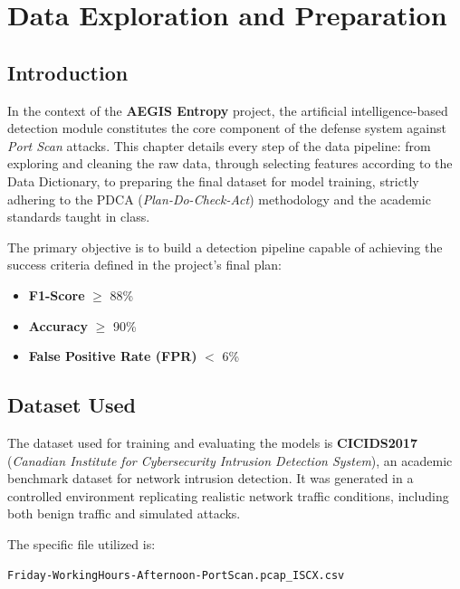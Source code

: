 
\chapter{Data Exploration and Preparation}

\section{Introduction}

In the context of the \textbf{AEGIS Entropy} project, the artificial intelligence-based detection module constitutes the core component of the defense system against \textit{Port Scan} attacks. This chapter details every step of the data pipeline: from exploring and cleaning the raw data, through selecting features according to the Data Dictionary, to preparing the final dataset for model training, strictly adhering to the PDCA (\textit{Plan-Do-Check-Act}) methodology and the academic standards taught in class.

The primary objective is to build a detection pipeline capable of achieving the success criteria defined in the project's final plan:
\begin{itemize}
    \item \textbf{F1-Score} $\geq$ 88\%
    \item \textbf{Accuracy} $\geq$ 90\%
    \item \textbf{False Positive Rate (FPR)} $<$ 6\%
\end{itemize}

\section{Dataset Used}

The dataset used for training and evaluating the models is \textbf{CICIDS2017} (\textit{Canadian Institute for Cybersecurity Intrusion Detection System}), an academic benchmark dataset for network intrusion detection. It was generated in a controlled environment replicating realistic network traffic conditions, including both benign traffic and simulated attacks.

The specific file utilized is:
\begin{center}
\texttt{Friday-WorkingHours-Afternoon-PortScan.pcap\_ISCX.csv}
\end{center}


